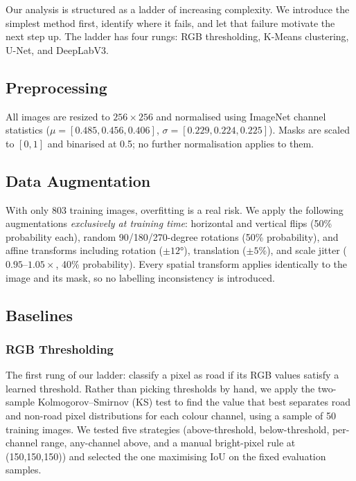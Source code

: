 \documentclass[conference]{IEEEtran}
\begin{document}
Our analysis is structured as a ladder of increasing complexity.
We introduce the simplest method first, identify where it fails, and let that failure motivate
the next step up.
The ladder has four rungs: RGB thresholding, K-Means clustering, U-Net, and DeepLabV3.

\subsection{Preprocessing}

All images are resized to $256 \times 256$ and normalised using ImageNet channel statistics
($\mu = [0.485, 0.456, 0.406]$, $\sigma = [0.229, 0.224, 0.225]$).
Masks are scaled to $[0,1]$ and binarised at 0.5; no further normalisation applies to them.

\subsection{Data Augmentation}

With only 803 training images, overfitting is a real risk.
We apply the following augmentations \textit{exclusively at training time}: horizontal and
vertical flips (50\% probability each), random 90/180/270-degree rotations (50\% probability),
and affine transforms including rotation ($\pm 12$°), translation ($\pm 5\%$), and scale jitter
($0.95$--$1.05\times$, 40\% probability).
Every spatial transform applies identically to the image and its mask,
so no labelling inconsistency is introduced.

\subsection{Baselines}
\label{sec:baselines}

\subsubsection{RGB Thresholding}

The first rung of our ladder: classify a pixel as road if its RGB values satisfy a learned
threshold.
Rather than picking thresholds by hand, we apply the two-sample Kolmogorov--Smirnov (KS)
test \cite{kolmogorov1933ks} to find the value that best separates road and non-road pixel
distributions for each colour channel, using a sample of 50 training images.
We tested five strategies (above-threshold, below-threshold, per-channel range, any-channel
above, and a manual bright-pixel rule at (150,150,150)) and selected the one maximising IoU
on the fixed evaluation samples.
\end{document}
